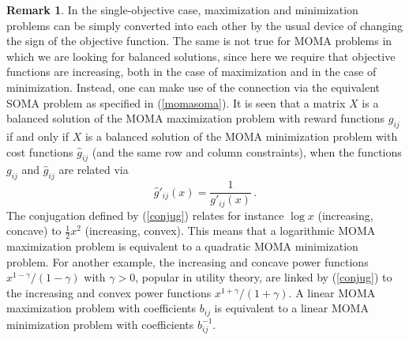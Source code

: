 \documentclass{article}
\theoremstyle{definition}
\newtheorem{remark}[theorem]{Remark}
\begin{document}
\begin{remark}
In the single-objective case, maximization and minimization problems can be simply converted into each other by the usual device of changing the sign of the objective function. The same is not true for MOMA problems in which we are looking for balanced solutions, since here we require that objective functions are increasing, both in the case of maximization and in the case of minimization. Instead, one can make use of the connection via the equivalent SOMA problem as specified in (\ref{momasoma}). It is seen that a matrix $X$ is a balanced solution of the MOMA maximization problem with reward functions $g_{ij}$ if and only if $X$ is a balanced solution of the MOMA minimization problem with cost functions $\hat{g}_{ij}$ (and the same row and column constraints), when the functions $g_{ij}$ and $\hat{g}_{ij}$ are related via
\begin{equation} \label{conjug}
\hat{g}'_{ij}(x) = \frac{1}{g'_{ij}(x)}\,.
\end{equation}
The conjugation defined by (\ref{conjug}) relates for instance $\log x$ (increasing, concave) to $\frac{1}{2}x^2$ (increasing, convex). This means that a logarithmic MOMA maximization problem is equivalent to a quadratic MOMA minimization problem. For another example, the increasing and concave power functions $x^{1-\gamma}/(1-\gamma)$ with $\gamma > 0$, popular in utility theory, are linked by (\ref{conjug}) to the increasing and convex power functions $x^{1+\gamma}/(1+\gamma)$. A linear MOMA maximization problem with coefficients $b_{ij}$ is equivalent to a linear MOMA minimization problem with coefficients $b_{ij}^{-1}$.
\end{remark}
\end{document}
